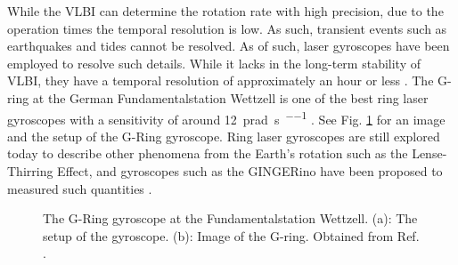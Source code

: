 \documentclass[a4paper]{report}
\numberwithin{equation}{section}
\begin{document}
While the VLBI can determine the rotation rate with high precision, due to the operation times the temporal resolution
is low. As such, transient events such as earthquakes and tides cannot be resolved. As of such, 
laser gyroscopes have been employed to resolve such details. While it lacks in the long-term stability of VLBI,
they have a temporal resolution of approximately an hour or less \cite{Wettzell2005}. The G-ring at the German
Fundamentalstation Wettzell is one of the best ring laser gyroscopes with a sensitivity of around \SI{12}{\pico\radian\per\second\per\sqrt{\hertz}} \cite{Groh2021}. 
See Fig. \ref{fig:gring_gyro} for an image and the setup of the G-Ring gyroscope. Ring laser gyroscopes are still explored today to 
describe other phenomena from the Earth's rotation such as the Lense-Thirring Effect, and gyroscopes such as the GINGERino have been proposed to 
measured such quantities \cite{Beverini2016}.

\begin{figure}[h!]
	\centering
	\quad
	\centering
	\caption{The G-Ring gyroscope at the Fundamentalstation Wettzell. (a):
	The setup of the gyroscope. (b): Image of the G-ring. Obtained from Ref. \cite{Wettzell2005}.}
	\label{fig:gring_gyro}
\end{figure}

\end{document}
